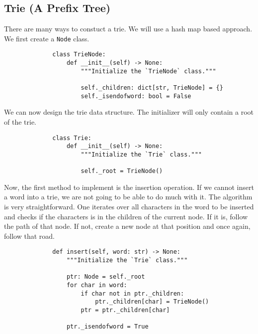 
\subsection{Trie (A Prefix Tree)}

There are many ways to constuct a trie. We will use a hash map based approach.
We first create a \texttt{Node} class.

\begin{figure}[H]
    \centering
    \begin{verbatim}
        class TrieNode:
            def __init__(self) -> None:
                """Initialize the `TrieNode` class."""

                self._children: dict[str, TrieNode] = {}
                self._isendofword: bool = False
    \end{verbatim}
\end{figure}

We can now design the trie data structure. The initializer will only contain a
root of the trie.

\begin{figure}[H]
    \centering
    \begin{verbatim}
        class Trie:
            def __init__(self) -> None:
                """Initialize the `Trie` class."""

                self._root = TrieNode()
    \end{verbatim}
\end{figure}

Now, the first method to implement is the insertion operation. If we cannot
insert a word into a trie, we are not going to be able to do much with it. The
algorithm is very straightforward. One iterates over all characters in the word
to be inserted and checks if the characters is in the children of the current
node. If it is, follow the path of that node. If not, create a new node at that
position and once again, follow that road.

\begin{figure}[H]
    \centering
    \begin{verbatim}
        def insert(self, word: str) -> None:
            """Initialize the `Trie` class."""

            ptr: Node = self._root
            for char in word:
                if char not in ptr._children:
                    ptr._children[char] = TrieNode()
                ptr = ptr._children[char]

            ptr._isendofword = True
    \end{verbatim}
\end{figure}

